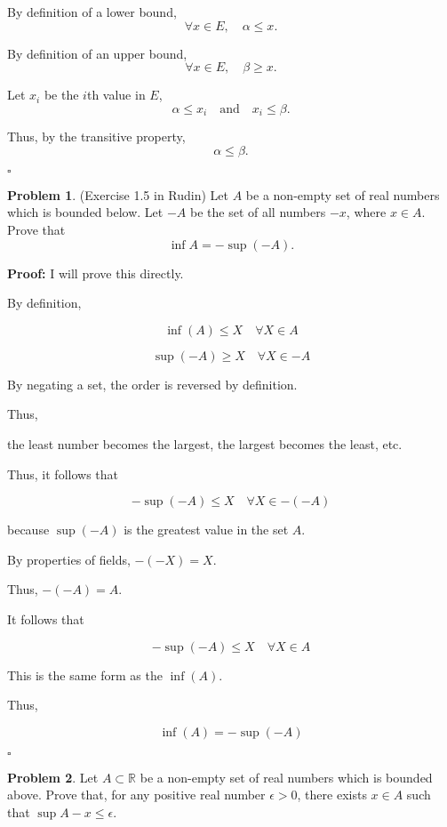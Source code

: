 \documentclass[12pt,oneside]{article}
\theoremstyle{definition}
\newtheorem{problem}{Problem}
\begin{document}
By definition of a lower bound,
\[
\forall x \in E, \quad \alpha \leq x.
\]

By definition of an upper bound,
\[
\forall x \in E, \quad \beta \geq x.
\]

Let \( x_i \) be the \( i \)th value in \( E \),
\[
\alpha \leq x_i \quad \text{and} \quad x_i \leq \beta.
\]

Thus, by the transitive property,
\[
\alpha \leq \beta.
\]

\(\square\)


\newpage 

\begin{problem}
(Exercise 1.5 in Rudin)
Let $A$ be a non-empty set of real numbers which is bounded below. 
Let $-A$ be the set of all numbers $-x$, where $x\in A$. 
Prove that 
\[
\inf A = - \sup (-A).
\]
\end{problem}
\textbf{Proof:} I will prove this directly.

By definition,

\[
\inf(A) \leq X \quad \forall X \in A
\]

\[
\sup(-A) \geq X \quad \forall X \in -A
\]

By negating a set, the order is reversed by definition.

Thus, 

the least number becomes the largest, the largest becomes the least, etc.

Thus, it follows that

\[
- \sup(-A) \leq X \quad \forall X \in -(-A)
\]

because \( \sup(-A) \) is the greatest value in the set \( A \).

By properties of fields, \( -(-X) = X \).

Thus, \( -(-A) = A \).

It follows that

\[
- \sup(-A) \leq X \quad \forall X \in A
\]

This is the same form as the \( \inf(A) \).

Thus,

\[
\inf(A) = -\sup(-A)
\]

\(\square\)

\newpage

\begin{problem}
Let $A \subset \mathbb{R}$ be a non-empty set of real numbers which is bounded above. 
Prove that, for any positive real number $\epsilon > 0$, there exists $x \in A$ such that $\sup A - x \leq \epsilon$. 
\end{problem}
\end{document}
